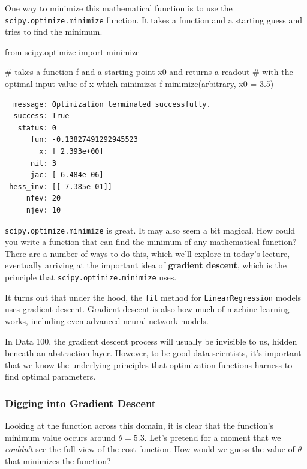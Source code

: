 \documentclass[
  letterpaper,
  DIV=11,
  numbers=noendperiod]{scrreprt}
\newenvironment{Shaded}{\begin{snugshade}}{\end{snugshade}}
\newcommand{\CommentTok}[1]{\textcolor[rgb]{0.37,0.37,0.37}{#1}}
\newcommand{\FloatTok}[1]{\textcolor[rgb]{0.68,0.00,0.00}{#1}}
\newcommand{\ImportTok}[1]{\textcolor[rgb]{0.00,0.46,0.62}{#1}}
\newcommand{\NormalTok}[1]{\textcolor[rgb]{0.00,0.23,0.31}{#1}}
\newcommand{\OperatorTok}[1]{\textcolor[rgb]{0.37,0.37,0.37}{#1}}
\begin{document}
One way to minimize this mathematical function is to use the
\texttt{scipy.optimize.minimize} function. It takes a function and a
starting guess and tries to find the minimum.

\begin{Shaded}
\begin{Highlighting}[]
\ImportTok{from}\NormalTok{ scipy.optimize }\ImportTok{import}\NormalTok{ minimize}

\CommentTok{\# takes a function f and a starting point x0 and returns a readout }
\CommentTok{\# with the optimal input value of x which minimizes f}
\NormalTok{minimize(arbitrary, x0 }\OperatorTok{=} \FloatTok{3.5}\NormalTok{)}
\end{Highlighting}
\end{Shaded}

\begin{verbatim}
  message: Optimization terminated successfully.
  success: True
   status: 0
      fun: -0.13827491292945523
        x: [ 2.393e+00]
      nit: 3
      jac: [ 6.484e-06]
 hess_inv: [[ 7.385e-01]]
     nfev: 20
     njev: 10
\end{verbatim}

\texttt{scipy.optimize.minimize} is great. It may also seem a bit
magical. How could you write a function that can find the minimum of any
mathematical function? There are a number of ways to do this, which
we'll explore in today's lecture, eventually arriving at the important
idea of \textbf{gradient descent}, which is the principle that
\texttt{scipy.optimize.minimize} uses.

It turns out that under the hood, the \texttt{fit} method for
\texttt{LinearRegression} models uses gradient descent. Gradient descent
is also how much of machine learning works, including even advanced
neural network models.

In Data 100, the gradient descent process will usually be invisible to
us, hidden beneath an abstraction layer. However, to be good data
scientists, it's important that we know the underlying principles that
optimization functions harness to find optimal parameters.

\subsubsection{Digging into Gradient
Descent}\label{digging-into-gradient-descent}

Looking at the function across this domain, it is clear that the
function's minimum value occurs around \(\theta = 5.3\). Let's pretend
for a moment that we \emph{couldn't} see the full view of the cost
function. How would we guess the value of \(\theta\) that minimizes the
function?
\end{document}
